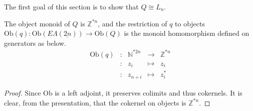 \documentclass{amsbook} %
\newcommand{\mb}{\mathbf}
\newcommand{\ZZ}{\mathbb{Z}}
\newcommand{\ELnn}{E\Lambda(\underline{2n})}
\newcommand{\ob}{\textrm{Ob}}
\newcommand{\mon}{\ensuremath{\mb{Mon}}}
\numberwithin{section}{chapter}
\begin{document}
The first goal of this section is to show that $Q \cong L_n$.

\begin{prop}\label{Qobj} The object monoid of $Q$ is $\mathbb{Z}^{*n}$, and the restriction of $q$ to objects $\mathrm{Ob}(q): \mathrm{Ob}(\ELnn) \to \mathrm{Ob}(Q)$ is the monoid homomorphism defined on generators as below.
\[ \begin{array}{rlrlll}
			\mathrm{Ob}(q) & : & \mathbb{N}^{\ast 2n} & \to & \mathbb{Z}^{\ast n} \\
			& : & z_i & \mapsto & z_i  \\
			& : & z_{n+i} & \mapsto & z_i^*		
		\end{array}
\]
\end{prop}
\begin{proof}
Since $\ob$ is a left adjoint, it preserves colimits and thus cokernels. It is clear, from the presentation, that the cokernel on objects is $\ZZ^{*n}$.

%
\end{proof}
\end{document}
